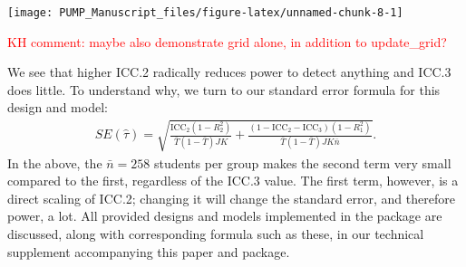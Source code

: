 \documentclass[
]{article}
\newenvironment{Shaded}{\begin{snugshade}}{\end{snugshade}}
\newcommand{\DataTypeTok}[1]{\textcolor[rgb]{0.13,0.29,0.53}{#1}}
\newcommand{\DecValTok}[1]{\textcolor[rgb]{0.00,0.00,0.81}{#1}}
\newcommand{\FloatTok}[1]{\textcolor[rgb]{0.00,0.00,0.81}{#1}}
\newcommand{\KeywordTok}[1]{\textcolor[rgb]{0.13,0.29,0.53}{\textbf{#1}}}
\newcommand{\NormalTok}[1]{#1}
\newcommand{\OperatorTok}[1]{\textcolor[rgb]{0.81,0.36,0.00}{\textbf{#1}}}
\newcommand{\StringTok}[1]{\textcolor[rgb]{0.31,0.60,0.02}{#1}}
\begin{document}
\begin{Shaded}
\end{Shaded}

\begin{center}\texttt{[image: PUMP\_Manuscript\_files/figure-latex/unnamed-chunk-8-1]} \end{center}

\textcolor{red}{KH comment: maybe also demonstrate grid alone, in addition to update\_grid?}

We see that higher ICC.2 radically reduces power to detect anything and
ICC.3 does little. To understand why, we turn to our standard error
formula for this design and model: \[
\begin{aligned}
SE( \hat{\tau} ) = \sqrt{
\frac{\text{ICC}_{2}(1 - R^2_{2})}{\bar{T}(1 - \bar{T}) JK} +
\frac{(1-\text{ICC}_{2} - \text{ICC}_{3})(1-R^2_{1})}{\bar{T}(1 - \bar{T}) J K\bar{n}} } .
\end{aligned}
\] In the above, the \(\bar{n} = 258\) students per group makes the
second term very small compared to the first, regardless of the ICC.3
value. The first term, however, is a direct scaling of ICC.2; changing
it will change the standard error, and therefore power, a lot. All
provided designs and models implemented in the package are discussed,
along with corresponding formula such as these, in our technical
supplement accompanying this paper and package.
\end{document}

